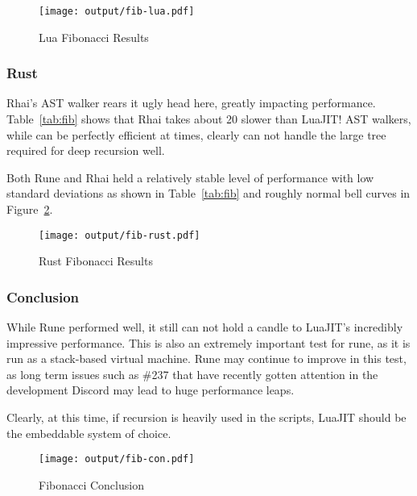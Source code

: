 \begin{figure}[H]
	\centering
		\texttt{[image: output/fib-lua.pdf]}
	\caption{Lua Fibonacci Results}
	\label{fig:fib-lua}
\end{figure}

\subsubsection{Rust}
Rhai's AST walker\cite{rhai:walker} rears it ugly head here, greatly impacting performance. Table~\ref{tab:fib} shows that Rhai takes about 20 slower than LuaJIT! AST walkers, while can be perfectly efficient at times, clearly can not handle the large tree required for deep recursion well.

Both Rune and Rhai held a relatively stable level of performance with low standard deviations as shown in Table~\ref{tab:fib} and roughly normal bell curves in Figure~\ref{fig:fib-rust}.

\begin{figure}[H]
	\centering
		\texttt{[image: output/fib-rust.pdf]}
	\caption{Rust Fibonacci Results}
	\label{fig:fib-rust}
\end{figure}

\subsubsection{Conclusion}
While Rune performed well, it still can not hold a candle to LuaJIT's incredibly impressive performance. This is also an extremely important test for rune, as it is run as a stack-based virtual machine.\cite{rune:stack} Rune may continue to improve in this test, as long term issues such as \#237\cite{rune:JIT} that have recently gotten attention in the development Discord may lead to huge performance leaps.

Clearly, at this time, if recursion is heavily used in the scripts, LuaJIT should be the embeddable system of choice.

\begin{figure}[H]
	\centering
		\texttt{[image: output/fib-con.pdf]}
	\caption{Fibonacci Conclusion}
	\label{fig:fib-con}
\end{figure}
